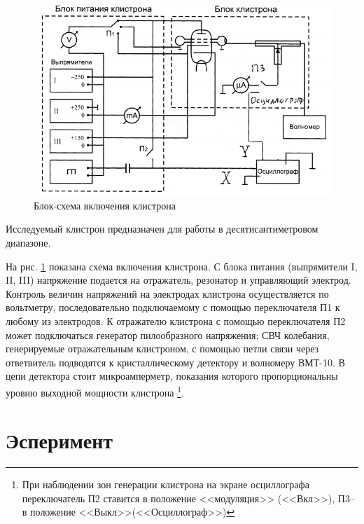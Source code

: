 \begin{figure}[H]
	\centering
	\includegraphics[width=\textwidth]{text/fig4}
	\caption{ Блок-схема включения клистрона}
	\label{fig:4}
\end{figure}

Исследуемый клистрон предназначен для работы в десятисантиметровом диапазоне.

На рис. \ref{fig:4} показана схема включения клистрона. С блока питания (выпрямители I, II, III) напряжение подается на отражатель, резонатор и управляющий электрод. Контроль величин напряжений на электродах клистрона осуществляется по вольтметру, последовательно подключаемому с помощью
переключателя П1 к любому из электродов. К отражателю клистрона с по­мощью переключателя П2 может подключаться генератор пилообразного
напряжения; СВЧ колебания, генерируемые отражательным клистроном, с помощью петли связи через ответвитель подводятся к кристаллическому
детектору и волномеру ВМТ-10. В цепи детектора стоит микроамперметр, показания которого пропорциональны уровню выходной мощности клистрона
\footnote{При наблюдении зон генерации клистрона на экране осциллографа переключатель П2 ставится  в положение <<модуляция>> (<<Вкл>>), П3--в положение <<Выкл>>(<<Осциллограф>>)}.

\section{Эсперимент}
